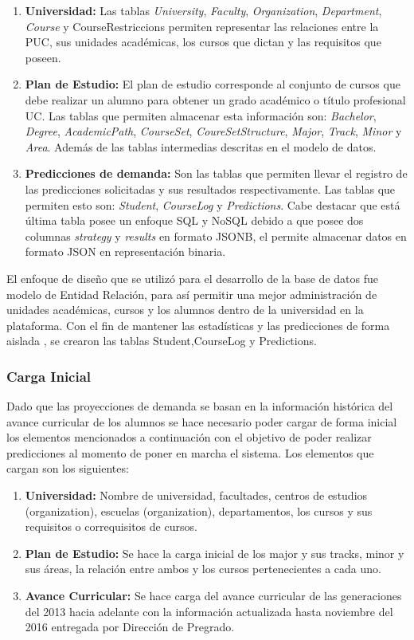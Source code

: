 \begin{enumerate}
	\item \textbf{Universidad:} Las tablas \textit{University}, \textit{Faculty}, \textit{Organization}, \textit{Department}, \textit{Course} y CourseRestriccions permiten representar las relaciones entre la PUC, sus unidades académicas, los cursos que dictan y las requisitos que poseen.
	\item \textbf{Plan de Estudio:} El plan de estudio corresponde al conjunto de cursos que debe realizar un alumno para obtener un grado académico o título profesional UC. Las tablas que permiten almacenar esta información son: \textit{Bachelor}, \textit{Degree}, \textit{AcademicPath}, \textit{CourseSet}, \textit{CoureSetStructure}, \textit{Major}, \textit{Track}, \textit{Minor} y \textit{Area}. Además de las tablas intermedias descritas en el modelo de datos.
	\item \textbf{Predicciones de demanda:} Son las tablas que permiten llevar el registro de las predicciones solicitadas y sus resultados respectivamente. Las tablas que permiten esto son: \textit{Student}, \textit{CourseLog} y \textit{Predictions}. Cabe destacar que está última tabla posee un enfoque SQL y NoSQL debido a que posee dos columnas \textit{strategy} y \textit{results} en formato JSONB, el permite almacenar datos en formato JSON en representación binaria.
\end{enumerate}

El enfoque de diseño que se utilizó para el desarrollo de la base de datos fue modelo de Entidad Relación, para así permitir una mejor administración de unidades académicas, cursos y los alumnos dentro de la universidad en la plataforma. Con el fin de mantener las estadísticas y las predicciones de forma aislada , se crearon las tablas Student,CourseLog y Predictions.

\subsubsection{Carga Inicial \label{sec:initial_data_load}}

Dado que las proyecciones de demanda se basan en la información histórica del avance curricular de los alumnos se hace necesario poder cargar de forma inicial los elementos mencionados a continuación con el objetivo de poder realizar predicciones al momento de poner en marcha el sistema. Los elementos que cargan son los siguientes:

\begin{enumerate}
	\item \textbf{Universidad:} Nombre de universidad, facultades, centros de estudios (organization), escuelas (organization), departamentos, los cursos y sus requisitos o correquisitos de cursos.
	\item \textbf{Plan de Estudio:} Se hace la carga inicial de los major y sus tracks, minor y sus áreas, la relación entre ambos y los cursos pertenecientes a cada uno.
	\item \textbf{Avance Curricular:} Se hace carga del avance curricular de las generaciones del 2013 hacia adelante con la información actualizada hasta noviembre del 2016 entregada por Dirección de Pregrado.
\end{enumerate}

